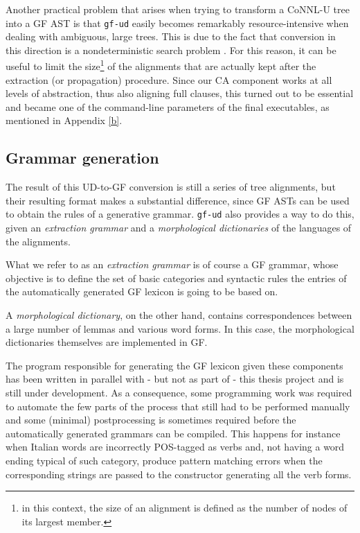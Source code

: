 Another practical problem that arises when trying to transform a CoNNL-U tree into a GF AST is that \texttt{gf-ud} easily becomes remarkably resource-intensive when dealing with ambiguous, large trees. 
This is due to the fact that conversion in this direction is a nondeterministic search problem \cite{udgf}. 
For this reason, it can be useful to limit the size\footnote{in this context, the size of an alignment is defined as the number of nodes of its largest member.} of the alignments that are actually kept after the extraction (or propagation) procedure. Since our CA component works at all levels of abstraction, thus also aligning full clauses, this turned out to be essential and became one of the command-line parameters of the final executables, as mentioned in Appendix \ref{b}. \smallskip

\subsection{Grammar generation} \label{grgn}
The result of this UD-to-GF conversion is still a series of tree alignments, but their resulting format makes a substantial difference, since GF ASTs can be used to obtain the rules of a generative grammar. \texttt{gf-ud} also provides a way to do this, given an \textit{extraction grammar} and a \textit{morphological dictionaries} of the languages of the alignments. \smallskip

What we refer to as an \textit{extraction grammar} is of course a GF grammar, whose objective is to define the set of basic categories and syntactic rules the entries of the automatically generated GF lexicon is going to be based on. \smallskip

A \textit{morphological dictionary}, on the other hand, contains correspondences between a large number of lemmas and various word forms. In this case, the morphological dictionaries themselves are implemented in GF. \smallskip

The program responsible for generating the GF lexicon given these components has been written in parallel with - but not as part of - this thesis project and is still under development. As a consequence, some programming work was required to automate the few parts of the process that still had to be performed manually and some (minimal) postprocessing is sometimes required before the automatically generated grammars can be compiled. This happens for instance when Italian words are incorrectly POS-tagged as verbs and, not having a word ending typical of such category, produce pattern matching errors when the corresponding strings are passed to the constructor generating all the verb forms. \smallskip

